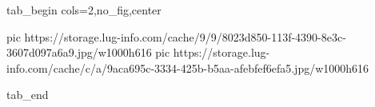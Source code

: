  
 
 
 
 

\ifcmt
  tab_begin cols=2,no_fig,center

     pic https://storage.lug-info.com/cache/9/9/8023d850-113f-4390-8e3c-3607d097a6a9.jpg/w1000h616
		 pic https://storage.lug-info.com/cache/c/a/9aca695c-3334-425b-b5aa-afebfef6efa5.jpg/w1000h616

  tab_end
\fi
